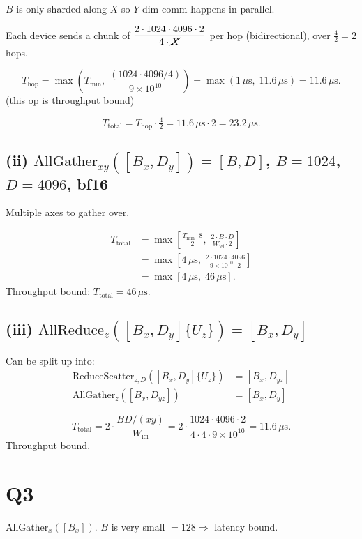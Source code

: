 \documentclass[11pt]{article}
\newcommand{\Ttotal}{T_{\text{total}}}
\newcommand{\Thop}{T_{\text{hop}}}
\newcommand{\Tmin}{T_{\min}}
\newcommand{\Wici}{W_{\text{ici}}}
\begin{document}
$B$ is only sharded along $X$ so $Y$ dim comm happens in parallel.

Each device sends a chunk of $\dfrac{2 \cdot 1024 \cdot 4096 \cdot 2}{4 \cdot \cancel{X}}$ per hop (bidirectional), over $\tfrac{4}{2} = 2$ hops.

\[
\Thop = \max\!\left(\Tmin,\; \frac{(1024 \cdot 4096 / 4)}{9 \times 10^{10}}\right) = \max(1\,\mu\text{s},\; 11.6\,\mu\text{s}) = 11.6\,\mu\text{s}.
\]
(this op is throughput bound)

\[
\Ttotal = \Thop \cdot \tfrac{4}{2} = 11.6\,\mu\text{s} \cdot 2 = 23.2\,\mu\text{s}.
\]

\subsection*{(ii) $\text{AllGather}_{xy}([B_x, D_y]) = [B, D]$, $B = 1024$, $D = 4096$, bf16}

Multiple axes to gather over.

\begin{align*}
\Ttotal &= \max\!\left[\frac{\Tmin \cdot 8}{2},\; \frac{2 \cdot B \cdot D}{\Wici \cdot 2}\right] \\
        &= \max\!\left[4\,\mu\text{s},\; \frac{2 \cdot 1024 \cdot 4096}{9 \times 10^{10} \cdot 2}\right] \\
        &= \max[4\,\mu\text{s},\; 46\,\mu\text{s}].
\end{align*}
Throughput bound: $\Ttotal = 46\,\mu\text{s}$.

\subsection*{(iii) $\text{AllReduce}_z([B_x, D_y]\{U_z\}) = [B_x, D_y]$}

Can be split up into:
\begin{align*}
\text{ReduceScatter}_{z,D}([B_x, D_y]\{U_z\}) &= [B_x, D_{yz}] \\
\text{AllGather}_z([B_x, D_{yz}]) &= [B_x, D_y]
\end{align*}

\[
\Ttotal = 2 \cdot \frac{BD/(xy)}{\Wici}
       = 2 \cdot \frac{1024 \cdot 4096 \cdot 2}{4 \cdot 4 \cdot 9 \times 10^{10}}
       = 11.6\,\mu\text{s}.
\]
Throughput bound.

\section*{Q3}

$\text{AllGather}_x([B_x])$. $B$ is very small $= 128 \Rightarrow$ latency bound.
\end{document}
